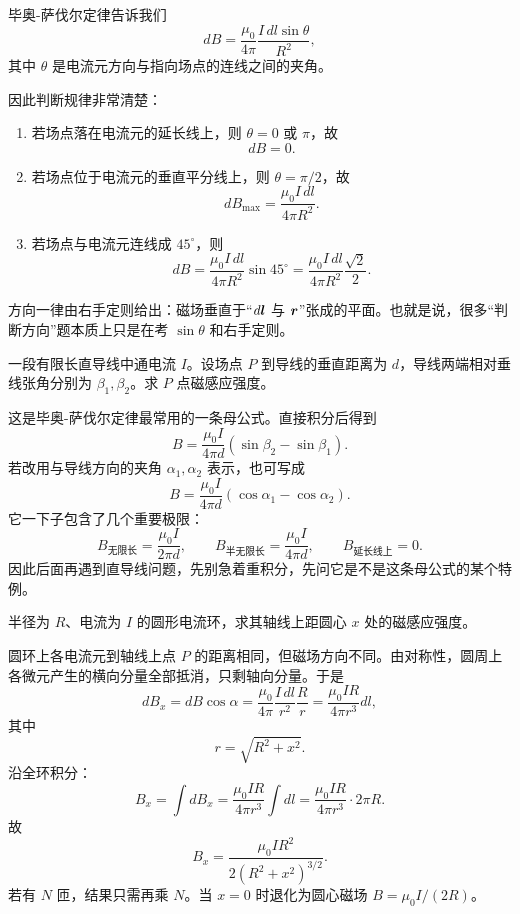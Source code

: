 \documentclass[lang=cn,11pt]{elegantbook}
\begin{document}
\begin{solution}
毕奥-萨伐尔定律告诉我们
\[
dB=\frac{\mu_0}{4\pi}\frac{I\,dl\sin\theta}{R^2},
\]
其中 \(\theta\) 是电流元方向与指向场点的连线之间的夹角。

因此判断规律非常清楚：
\begin{enumerate}
  \item 若场点落在电流元的延长线上，则 \(\theta=0\) 或 \(\pi\)，故
  \[
  dB=0.
  \]
  \item 若场点位于电流元的垂直平分线上，则 \(\theta=\pi/2\)，故
  \[
  dB_{\max}=\frac{\mu_0 I\,dl}{4\pi R^2}.
  \]
  \item 若场点与电流元连线成 \(45^\circ\)，则
  \[
  dB=\frac{\mu_0 I\,dl}{4\pi R^2}\sin45^\circ
  =\frac{\mu_0 I\,dl}{4\pi R^2}\frac{\sqrt2}{2}.
  \]
\end{enumerate}
方向一律由右手定则给出：磁场垂直于“\(d\vb*{l}\) 与 \(\vb*{r}\)”张成的平面。也就是说，很多“判断方向”题本质上只是在考 \(\sin\theta\) 和右手定则。
\end{solution}

\begin{example}[有限长直导线的磁场]
一段有限长直导线中通电流 \(I\)。设场点 \(P\) 到导线的垂直距离为 \(d\)，导线两端相对垂线张角分别为 \(\beta_1,\beta_2\)。求 \(P\) 点磁感应强度。
\end{example}

\begin{solution}
这是毕奥-萨伐尔定律最常用的一条母公式。直接积分后得到
\[
\boxed{
B=\frac{\mu_0I}{4\pi d}\left(\sin\beta_2-\sin\beta_1\right)
}.
\]
若改用与导线方向的夹角 \(\alpha_1,\alpha_2\) 表示，也可写成
\[
B=\frac{\mu_0I}{4\pi d}\left(\cos\alpha_1-\cos\alpha_2\right).
\]
它一下子包含了几个重要极限：
\[
B_{\text{无限长}}=\frac{\mu_0I}{2\pi d},
\qquad
B_{\text{半无限长}}=\frac{\mu_0I}{4\pi d},
\qquad
B_{\text{延长线上}}=0.
\]
因此后面再遇到直导线问题，先别急着重积分，先问它是不是这条母公式的某个特例。
\end{solution}

\begin{example}[圆形电流环轴线上的磁场]
半径为 \(R\)、电流为 \(I\) 的圆形电流环，求其轴线上距圆心 \(x\) 处的磁感应强度。
\end{example}

\begin{solution}
圆环上各电流元到轴线上点 \(P\) 的距离相同，但磁场方向不同。由对称性，圆周上各微元产生的横向分量全部抵消，只剩轴向分量。于是
\[
dB_x=dB\cos\alpha
=\frac{\mu_0}{4\pi}\frac{I\,dl}{r^2}\frac{R}{r}
=\frac{\mu_0IR}{4\pi r^3}dl,
\]
其中
\[
r=\sqrt{R^2+x^2}.
\]
沿全环积分：
\[
B_x=\int dB_x
=\frac{\mu_0IR}{4\pi r^3}\int dl
=\frac{\mu_0IR}{4\pi r^3}\cdot 2\pi R.
\]
故
\[
\boxed{
B_x=\frac{\mu_0IR^2}{2(R^2+x^2)^{3/2}}
}.
\]
若有 \(N\) 匝，结果只需再乘 \(N\)。当 \(x=0\) 时退化为圆心磁场 \(B=\mu_0I/(2R)\)。
\end{solution}
\end{document}
